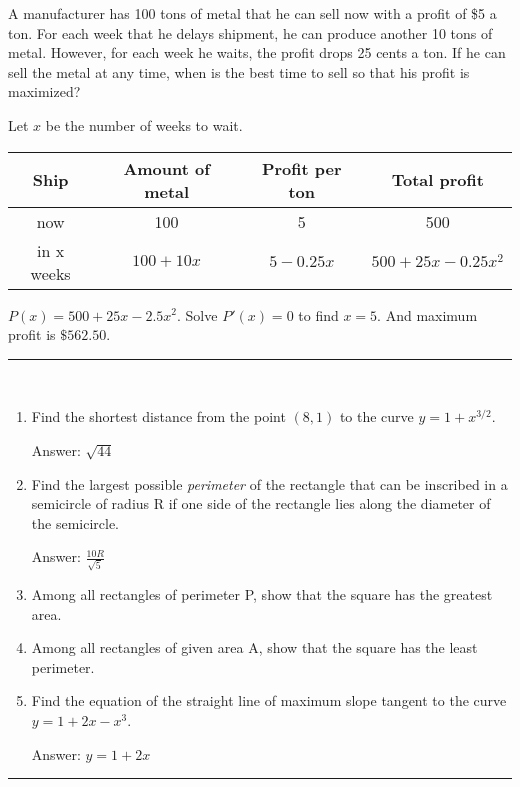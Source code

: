 \documentclass[../calc1-main.tex]{subfiles}
\begin{document}
\begin{example}
  A manufacturer has 100 tons of metal that he can sell now with a profit of \$5 a ton.  For each week that he delays shipment, he can produce another 10 tons of metal.  However, for each week he waits, the profit drops 25 cents a ton.  If he can sell the metal at any time, when is the best time to sell so that his profit is maximized?
\end{example}
\begin{solution}
  Let $x$ be the number of weeks to wait.
  \begin{table}[H]
    \centering
    \begin{tabular}{|c|c|c|c|}
      \hline
      Ship & Amount of metal & Profit per ton & Total profit \\
      \hline
      now & 100 & 5 & 500 \\
      in x weeks & $100+10x$ & $5-0.25 x$ & $500+25x-0.25 x^2$\\
      \hline
    \end{tabular}
  \end{table}
  $P(x) = 500 + 25x - 2.5x^2$. Solve $P'(x) = 0$ to find $x=5$. And maximum profit is $\$562.50$.
\end{solution}

\rule{\textwidth}{1pt}
\begin{multicols}{2}
\begin{exercise}
~\\
  \begin{enumerate}
    \item Find the shortest distance from the point $(8,1)$ to the curve $y=1+x^{3/2}$.

    Answer: $\sqrt{44}$
    \item Find the largest possible \textit{perimeter} of the  rectangle that can be inscribed in a semicircle of radius R if one side of the rectangle lies along the diameter of the semicircle.

    Answer: $\frac{10 R}{\sqrt{5}}$
    \item Among all rectangles of perimeter P, show that the square has the greatest area.
    \item Among all rectangles of given area A, show that the square has the least perimeter.
    \item Find the equation of the straight line of maximum slope tangent to the curve $y=1+2x-x^3$.

    Answer: $y=1+2x$
  \end{enumerate}
\end{exercise}
\end{multicols}
\rule{\textwidth}{1pt}
\end{document}
